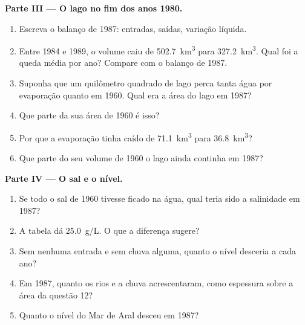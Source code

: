 \begin{problem}
\medskip
\noindent\textbf{Parte III --- O lago no fim dos anos 1980.}
\begin{enumerate}[resume]
  \item Escreva o balanço de 1987: entradas, saídas, variação líquida.
  \item Entre 1984 e 1989, o volume caiu de \qty{502.7}{km^3} para
        \qty{327.2}{km^3}. Qual foi a queda média por ano? Compare com o
        balanço de 1987.
  \item Suponha que um quilômetro quadrado de lago perca tanta água por
        evaporação quanto em 1960. Qual era a área do lago em 1987?
  \item Que parte da sua área de 1960 é isso?
  \item Por que a evaporação tinha caído de \qty{71.1}{km^3} para
        \qty{36.8}{km^3}?
  \item Que parte do seu volume de 1960 o lago ainda continha em 1987?
\end{enumerate}

\medskip
\noindent\textbf{Parte IV --- O sal e o nível.}
\begin{enumerate}[resume]
  \item Se todo o sal de 1960 tivesse ficado na água, qual teria sido a
        salinidade em 1987?
  \item A tabela dá \qty{25.0}{g/L}. O que a diferença sugere?
  \item Sem nenhuma entrada e sem chuva alguma, quanto o nível desceria a
        cada ano?
  \item Em 1987, quanto os rios e a chuva acrescentaram, como espessura
        sobre a área da questão 12?
  \item Quanto o nível do Mar de Aral desceu em 1987?
\end{enumerate}
\end{problem}
